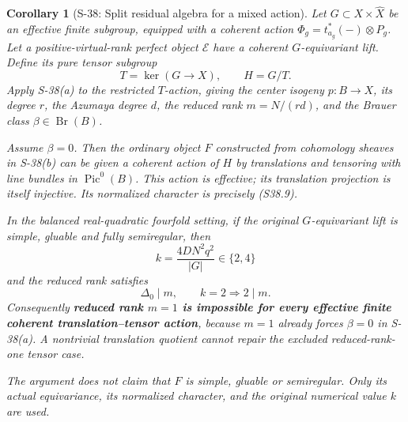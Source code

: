 \documentclass[11pt,a4paper]{article}
\newtheorem{corollary}[theorem]{Corollary}
\theoremstyle{definition}
\begin{document}
\begin{corollary}[S-38: Split residual algebra for a mixed action]
\label{cor:semireg-mixed-reduced-rank}
Let \(G\subset X\times\widehat X\) be an effective finite subgroup, equipped with a coherent action \(\Phi_g=t_{a_g}^*(-)\otimes P_g\). Let a positive-virtual-rank perfect object \(\mathcal E\) have a coherent \(G\)-equivariant lift. Define its pure tensor subgroup \[
 T=\ker(G\longrightarrow X),\qquad H=G/T.
 \tag{S38.16}
\] Apply S-38(a) to the restricted \(T\)-action, giving the center isogeny \(p:B\to X\), its degree \(r\), the Azumaya degree \(d\), the reduced rank \(m=N/(rd)\), and the Brauer class \(\beta\in\operatorname{Br}(B)\).

Assume \(\beta=0\). Then the ordinary object \(F\) constructed from cohomology sheaves in S-38(b) can be given a coherent action of \(H\) by translations and tensoring with line bundles in \(\operatorname{Pic}^0(B)\). This action is effective; its translation projection is itself injective. Its normalized character is precisely (S38.9).

In the balanced real-quadratic fourfold setting, if the original \(G\)-equivariant lift is simple, gluable and fully semiregular, then \[
 k=\frac{4DN^2q^2}{|G|}\in\{2,4\}
\] and the reduced rank satisfies \[
 \boxed{\Delta_0\mid m,\qquad k=2\Longrightarrow2\mid m.}
 \tag{S38.17}
\] Consequently \textbf{reduced rank \(m=1\) is impossible for every effective finite coherent translation--tensor action}, because \(m=1\) already forces \(\beta=0\) in S-38(a). A nontrivial translation quotient cannot repair the excluded reduced-rank-one tensor case.

The argument does not claim that \(F\) is simple, gluable or semiregular. Only its actual equivariance, its normalized character, and the original numerical value \(k\) are used.
\end{corollary}
\end{document}
